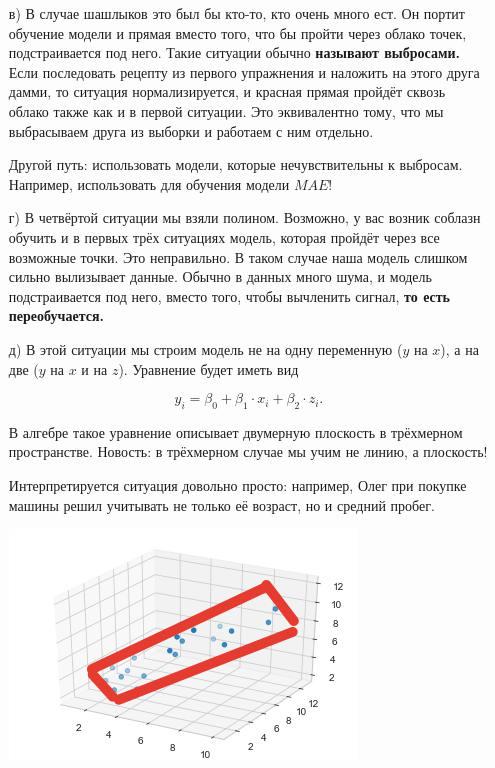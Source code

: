 \documentclass[12pt, a4paper, oneside]{article}
\theoremstyle{plain} %
\theoremstyle{definition}
\newcommand{\indef}[1]{\textbf{ \color{green} #1}}
\begin{document}
\begin{solution}
\begin{enumerate}
		\item[в)]  В случае шашлыков это был бы кто-то, кто очень много ест.  Он портит обучение модели и прямая вместо того, что бы пройти через облако точек, подстраивается под него. Такие ситуации обычно \indef{называют выбросами.} Если последовать рецепту из первого упражнения и наложить на этого друга дамми, то ситуация нормализируется, и красная прямая пройдёт сквозь облако также как и в первой ситуации. Это эквивалентно тому, что мы выбрасываем друга из выборки и работаем с ним отдельно.
		
		Другой путь: использовать модели, которые нечувствительны к выбросам. Например,  использовать для обучения модели $MAE$!
		
		\item[г)]  В четвёртой ситуации мы взяли полином. Возможно, у вас возник соблазн обучить и в первых трёх ситуациях модель, которая пройдёт через все возможные точки. Это неправильно. В таком случае наша модель слишком сильно вылизывает данные. Обычно в данных много шума, и модель подстраивается под него, вместо того, чтобы вычленить сигнал, \indef{то есть переобучается.} 
		
		\item[д)]  В этой ситуации мы строим модель не на одну переменную ($y$ на $x$), а на две ($y$ на $x$ и на $z$). Уравнение будет иметь вид 
		
		$$
		y_i = \beta_0 + \beta_1 \cdot x_i + \beta_2 \cdot z_i.
		$$
		
		В алгебре такое уравнение описывает двумерную плоскость в трёхмерном пространстве. Новость: в трёхмерном случае мы учим не линию, а плоскость!
		
		Интерпретируется ситуация довольно просто: например, Олег при покупке машины решил учитывать не только её возраст, но и средний пробег.
		
		\begin{center}
			\includegraphics[scale=0.8]{regr_pic_5_ans.png}
		\end{center}
	\end{enumerate}
\end{solution}
\end{document}
